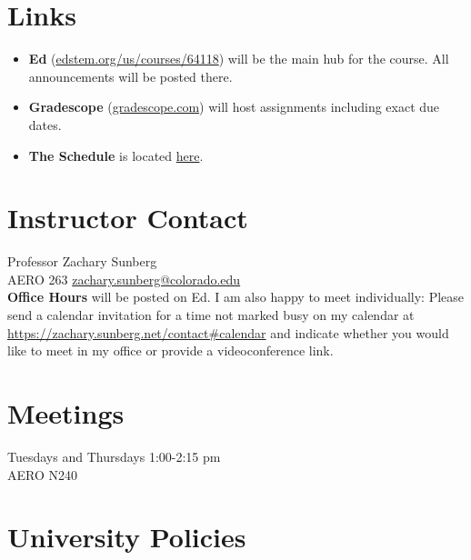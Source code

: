 \documentclass[9pt]{article}
\begin{document}
\section*{Links}

\begin{itemize}[noitemsep]
    \item \textbf{Ed} (\href{https://edstem.org/us/courses/64118}{edstem.org/us/courses/64118}) will be the main hub for the course. All announcements will be posted there.
    \item \textbf{Gradescope} (\url{gradescope.com}) will host assignments including exact due dates.
    \item \textbf{The Schedule} is located \href{https://docs.google.com/spreadsheets/d/1WS52PyQnZtoPaRv4gSBCI2F6-yDppQboChvhXCyA8yU/edit?usp=sharing}{here}.
\end{itemize}

\section*{Instructor Contact}

Professor Zachary Sunberg\\
AERO 263 \href{mailto://zachary.sunberg@colorado.edu}{zachary.sunberg@colorado.edu}\\
\textbf{Office Hours} will be posted on Ed. I am also happy to meet individually: Please send a calendar invitation for a time not marked busy on my calendar at \url{ https://zachary.sunberg.net/contact#calendar} and indicate whether you would like to meet in my office or provide a videoconference link. \\

\section*{Meetings}

Tuesdays and Thursdays 1:00-2:15 pm\\
AERO N240

\section*{University Policies}

\begin{description}

\end{description}
\end{document}
